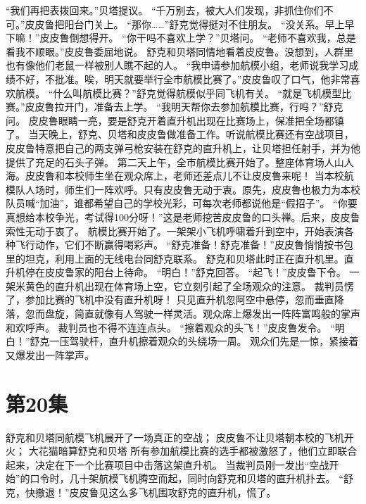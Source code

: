 \documentclass[a4paper,12pt,UTF8,twoside]{ctexbook}
\begin{document}
        “我们再把表拨回来。”贝塔提议。 
        “千万别去，被大人们发现，非抓住你们不可。”皮皮鲁把阳台门关上。 
        “那你……”舒克觉得挺对不住朋友。 
        “没关系。早上早下嘛！”皮皮鲁倒想得开。 
        “你干吗不喜欢上学？”贝塔问。 
        “老师不喜欢我，总是看我不顺眼。”皮皮鲁委屈地说。 
        舒克和贝塔同情地看着皮皮鲁。没想到，人群里也有像他们老鼠一样被别人瞧不起的人。 
        “我申请参加航模小组，老师说我学习成绩不好，不批准。唉，明天就要举行全市航模比赛了。”皮皮鲁叹了口气，他非常喜欢航模。 
        “什么叫航模比赛？”舒克觉得航模似乎同飞机有关。 
        “就是飞机模型比赛。”皮皮鲁拉开门，准备去上学。 
        “我明天帮你去参加航模比赛，行吗？”舒克问。 
        皮皮鲁眼睛一亮，要是舒克开着直升机出现在比赛场上，保准把全场都镇了。 
        当天晚上，舒克、贝塔和皮皮鲁做准备工作。听说航模比赛还有空战项目，皮皮鲁特意把自己的两支弹弓枪安装在舒克的直升机上，让贝塔担任射手，并为他提供了充足的石头子弹。 
        第二天上午，全市航模比赛开始了。整座体育场人山人海。皮皮鲁和本校师生坐在观众席上，老师还差点儿不让皮皮鲁来呢！ 
        当本校航模队人场时，师生们一阵欢呼。只有皮皮鲁无动于衷。原先，皮皮鲁也极力为本校队员喊“加油”，谁都希望自己的学校光彩，可每次老师都说他是“假招子”。 
        “你要真想给本校争光，考试得100分呀！”这是老师挖苦皮皮鲁的口头禅。后来，皮皮鲁索性无动于衷了。 
        航模比赛开始了。一架架小飞机呼啸着升到空中，开始表演各种飞行动作，它们不断赢得喝彩声。 
        “舒克准备！舒克准备！”皮皮鲁悄悄按书包里的坦克，利用上面的无线电台同舒克联系。 
        舒克和贝塔此时正在直升机里。直升机停在皮皮鲁家的阳台上待命。 
        “明白！”舒克回答。 
        “起飞！”皮皮鲁下令。 
        一架米黄色的直升机出现在体育场上空，它立刻引起了全场观众的注意。 
        裁判员愣了，参加比赛的飞机中没有直升机呀！ 
        只见直升机忽阿空中悬停，忽而垂直降落，忽而盘旋，简直就像有人驾驶一样灵活。观众席上爆发出一阵阵富鸣般的掌声和欢呼声。 
        裁判员也不得不连连点头。 
        “擦着观众的头飞！”皮皮鲁发令。 
        “明白！”舒克一压驾驶杆，直升机擦着观众的头绕场一周。 
        观众们先是一惊，紧接着又爆发出一阵掌声。   \chapter{第20集} 
        舒克和贝塔同航模飞机展开了一场真正的空战； 
        皮皮鲁不让贝塔朝本校的飞机开火； 
        大花猫暗算舒克和贝塔   
        所有参加航模比赛的选手都被激怒了，他们立即联合起来，决定在下一个比赛项目中击落这架直升机。 
        当裁判员刚一发出“空战开始”的口令时，几十架航模飞机腾空而起，同时向舒克和贝塔的直升机扑去。 
        “舒克，快撤退！”皮皮鲁见这么多飞机围攻舒克的直升机，慌了。 
\end{document}
